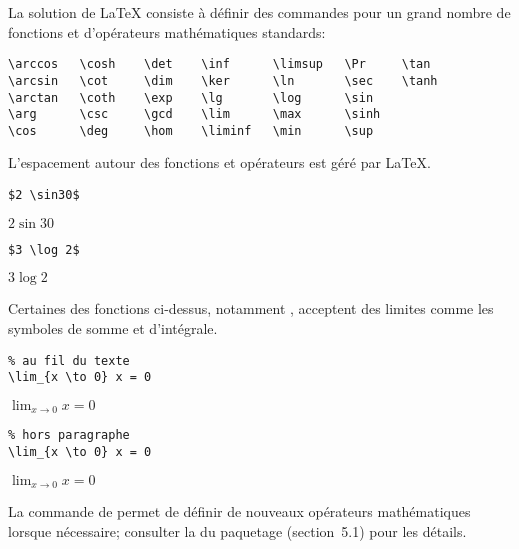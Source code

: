La solution de {\LaTeX} consiste à définir des commandes pour un grand
nombre de fonctions et d'opérateurs mathématiques standards:
\begin{lstlisting}
\arccos   \cosh    \det    \inf      \limsup   \Pr     \tan
\arcsin   \cot     \dim    \ker      \ln       \sec    \tanh
\arctan   \coth    \exp    \lg       \log      \sin
\arg      \csc     \gcd    \lim      \max      \sinh
\cos      \deg     \hom    \liminf   \min      \sup
\end{lstlisting}
L'espacement autour des fonctions et opérateurs est géré par {\LaTeX}.
\begin{demo}
  \begin{minipage}{0.45\linewidth}
    \begin{texample}
\begin{lstlisting}
$2 \sin30$
\end{lstlisting}
      \producing
      $2 \sin30$
    \end{texample}
  \end{minipage}
  \hfill
  \begin{minipage}{0.45\linewidth}
    \begin{texample}
\begin{lstlisting}
$3 \log 2$
\end{lstlisting}
      \producing
      $3 \log 2$
    \end{texample}
  \end{minipage}
\end{demo}

Certaines des fonctions ci-dessus, notamment \cmd{\lim}, acceptent des
limites comme les symboles de somme et d'intégrale.
\begin{demo}
  \begin{texample}
\begin{lstlisting}
% au fil du texte
\lim_{x \to 0} x = 0
\end{lstlisting}
    \producing $\lim_{x \to 0} x = 0$
  \end{texample}

  \begin{texample}
\begin{lstlisting}
% hors paragraphe
\lim_{x \to 0} x = 0
\end{lstlisting}
    \producing $\displaystyle \lim_{x \to 0} x = 0$
  \end{texample}
\end{demo}

La commande \cmd{\DeclareMathOperator} de  permet de
définir de nouveaux opérateurs mathématiques lorsque nécessaire;
consulter la %
du paquetage (section~5.1) pour les détails.


